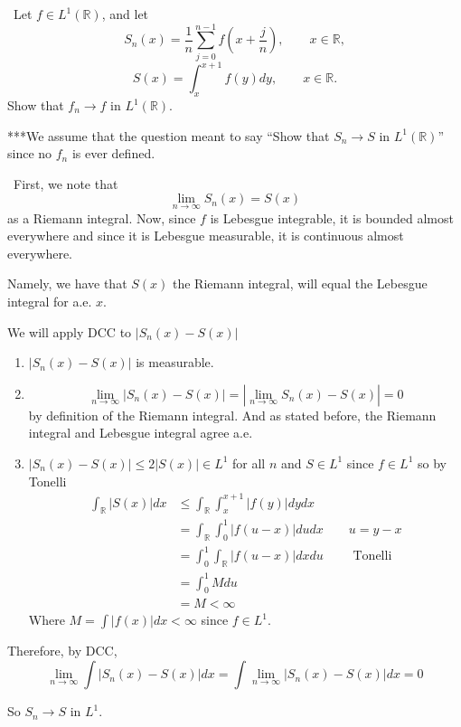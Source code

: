 \documentclass[12pt]{Homework}
\begin{document}
\begin{problem} $\,$
Let $f\in L^1(\mathbb{R})$, and let $$S_n(x)=\frac{1}{n}\sum_{j=0}^{n-1}f\left(x+\frac{j}{n}\right),\qquad x\in\mathbb{R},$$ $$S(x)=\int_x^{x+1}f(y)dy,\qquad x\in\mathbb{R}.$$ Show that $f_n\to f$ in $L^1(\mathbb{R}).$

\begin{mybox}
***We assume that the question meant to say ``Show that $S_n\to S$ in $L^1(\mathbb{R})$'' since no $f_n$ is ever defined.
\end{mybox}
\end{problem}


\begin{solution}$\,$
First, we note that $$\lim_{n\to\infty}S_n(x)=S(x)$$ as a Riemann integral. Now, since $f$ is Lebesgue integrable, it is bounded almost everywhere and since it is Lebesgue measurable, it is continuous almost everywhere. 

Namely, we have that $S(x)$ the Riemann integral, will equal the Lebesgue integral for a.e. $x.$

We will apply DCC to $|S_n(x)-S(x)|$
\begin{enumerate}
    \item $|S_n(x)-S(x)|$ is measurable.
    \item $$\lim_{n\to\infty}|S_n(x)-S(x)|=|\lim_{n\to\infty}S_n(x)-S(x)|=0$$ by definition of the Riemann integral. And as stated before, the Riemann integral and Lebesgue integral agree a.e.
    \item $|S_n(x)-S(x)|\le 2|S(x)|\in L^1$ for all $n$ and $S\in L^1$ since $f\in L^1$ so by Tonelli \begin{align*}
        \int_\mathbb{R}|S(x)|dx&\le \int_\mathbb{R}\int_x^{x+1}|f(y)|dydx\\
        &=\int_\mathbb{R}\int_0^1|f(u-x)|dudx\qquad u=y-x\\
        &=\int_0^1\int_\mathbb{R}|f(u-x)|dxdu\qquad\text{ Tonelli}\\
        &=\int_0^1Mdu\\
        &=M<\infty
    \end{align*} 
    Where $M=\int|f(x)|dx<\infty$ since $f\in L^1.$
\end{enumerate}

Therefore, by DCC, $$\lim_{n\to\infty}\int|S_n(x)-S(x)|dx=\int\lim_{n\to\infty}|S_n(x)-S(x)|dx=0$$

So $S_n\to S$ in $L^1.$
\end{solution}
\newpage
\end{document}
